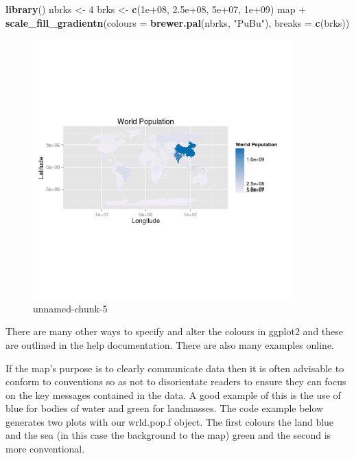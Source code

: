\documentclass[]{article}
\newenvironment{Shaded}{}{}
\newcommand{\KeywordTok}[1]{\textcolor[rgb]{0.00,0.44,0.13}{\textbf{{#1}}}}
\newcommand{\DataTypeTok}[1]{\textcolor[rgb]{0.56,0.13,0.00}{{#1}}}
\newcommand{\DecValTok}[1]{\textcolor[rgb]{0.25,0.63,0.44}{{#1}}}
\newcommand{\FloatTok}[1]{\textcolor[rgb]{0.25,0.63,0.44}{{#1}}}
\newcommand{\StringTok}[1]{\textcolor[rgb]{0.25,0.44,0.63}{{#1}}}
\newcommand{\NormalTok}[1]{{#1}}
\let\Oldincludegraphics\includegraphics
\renewcommand{\includegraphics}[1]{\Oldincludegraphics[width=10cm]{#1}}
\begin{document}
\begin{Shaded}
\begin{Highlighting}[]
\KeywordTok{library}\NormalTok{()}
\NormalTok{nbrks <- }\DecValTok{4}
\NormalTok{brks <- }\KeywordTok{c}\NormalTok{(}\FloatTok{1e+08}\NormalTok{, }\FloatTok{2.5e+08}\NormalTok{, }\FloatTok{5e+07}\NormalTok{, }\FloatTok{1e+09}\NormalTok{)}
\NormalTok{map + }\KeywordTok{scale_fill_gradientn}\NormalTok{(}\DataTypeTok{colours =} \KeywordTok{brewer.pal}\NormalTok{(nbrks, }\StringTok{"PuBu"}\NormalTok{), }\DataTypeTok{breaks =} \KeywordTok{c}\NormalTok{(brks))}
\end{Highlighting}
\end{Shaded}
\begin{figure}[htbp]
\centering
\includegraphics{figure/unnamed-chunk-5.png}
\caption{unnamed-chunk-5}
\end{figure}

There are many other ways to specify and alter the colours in ggplot2
and these are outlined in the help documentation. There are also many
examples online.

If the map's purpose is to clearly communicate data then it is often
advisable to conform to conventions so as not to disorientate readers to
ensure they can focus on the key messages contained in the data. A good
example of this is the use of blue for bodies of water and green for
landmasses. The code example below generates two plots with our
wrld.pop.f object. The first colours the land blue and the sea (in this
case the background to the map) green and the second is more
conventional.
\end{document}
